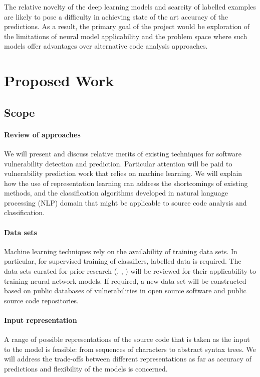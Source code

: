 \documentclass[proposal]{softeng}
\begin{document}
The relative novelty of the deep learning models and scarcity of labelled
examples are likely to pose a difficulty in achieving state of the art accuracy of
the predictions. As a result, the primary goal of the project would be exploration
of the limitations of neural model applicability and the problem space where 
such models offer advantages over alternative code analysis approaches.

\section{Proposed Work}

\subsection{Scope}

\paragraph{Review of approaches} We will present and discuss relative merits
of existing techniques for software vulnerability detection and prediction. 
Particular attention will be paid to vulnerability 
prediction work that relies on machine learning. We will explain how
the use of representation learning can address the shortcomings of existing
methods, and the classification algorithms developed in natural language
processing (NLP) domain that might be applicable to source code analysis and
classification.

\paragraph{Data sets} Machine learning techniques rely on the availability of
training data sets. In particular, for supervised training of classifiers,
labelled data is required. The data sets curated for prior research 
(\cite{li2016vulpecker}, \cite{perl2015vccfinder}, \cite{meneely2013patch})
will be reviewed for their applicability to training neural network models. 
If required, a new data set will be constructed based on public databases of 
vulnerabilities in open source software and public source code repositories.

\paragraph{Input representation} A range of possible representations of the source
code that is taken as the input to the model is feasible: from sequences of 
characters to abstract syntax trees. We will address the trade-offs between different
representations as far as accuracy of predictions and flexibility of the models
is concerned.
\end{document}
